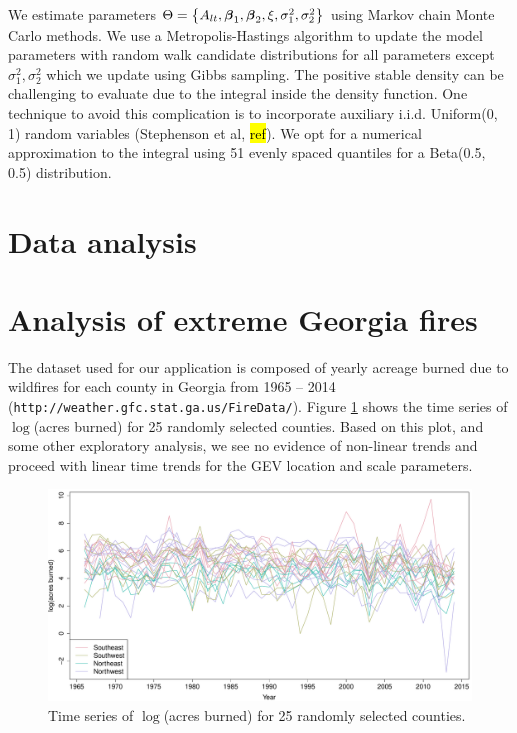 \documentclass[11pt]{article}
\begin{document}
We estimate parameters $\Theta = \left\{A_{lt}, \mbox{\boldmath $\beta$}_1, \mbox{\boldmath $\beta$}_2, \xi, \sigma^2_1, \sigma^2_2 \right\}$ using Markov chain Monte Carlo methods.
We use a Metropolis-Hastings algorithm to update the model parameters with random walk candidate distributions for all parameters except $\sigma^2_1, \sigma^2_2$ which we update using Gibbs sampling.
The positive stable density can be challenging to evaluate due to the integral inside the density function.
One technique to avoid this complication is to incorporate auxiliary i.i.d. Uniform(0, 1) random variables (Stephenson et al, \hl{ref}).
We opt for a numerical approximation to the integral using 51 evenly spaced quantiles for a Beta(0.5, 0.5) distribution.

\section{Data analysis}\label{s:analysis}

\section{Analysis of extreme Georgia fires}\label{s:georgia}
The dataset used for our application is composed of yearly acreage burned due to wildfires for each county in Georgia from 1965 -- 2014 (\texttt{http://weather.gfc.stat.ga.us/FireData/}).
Figure \ref{fig:firets25} shows the time series of $\log$(acres burned) for 25 randomly selected counties.
Based on this plot, and some other exploratory analysis, we see no evidence of non-linear trends and proceed with linear time trends for the GEV location and scale parameters.

\begin{figure}[htbp]  %
  \centering
  \includegraphics[width=0.80\linewidth]{plots/fire-spag-rand-25}
  \caption{Time series of $\log$(acres burned) for 25 randomly selected counties.}
  \label{fig:firets25}
\end{figure}
\end{document}
